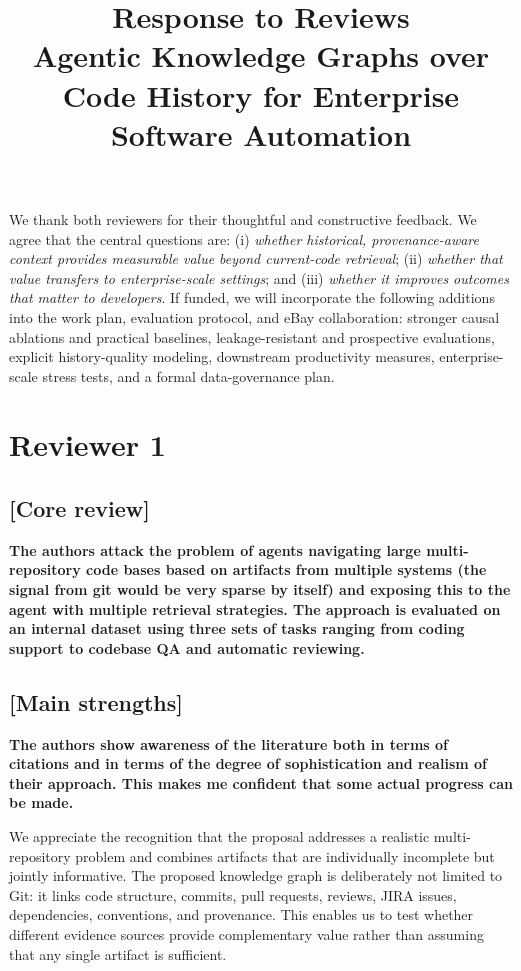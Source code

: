 \documentclass[11pt]{article}
\title{Response to Reviews\\[0.3em]
\large Agentic Knowledge Graphs over Code History for Enterprise Software Automation}
\author{}
\date{}
\begin{document}
\maketitle

We thank both reviewers for their thoughtful and constructive feedback. We agree that the central questions are: (i) \textit{whether historical, provenance-aware context provides measurable value beyond current-code retrieval}; (ii) \textit{whether that value transfers to enterprise-scale settings}; and (iii) \textit{whether it improves outcomes that matter to developers}. If funded, we will incorporate the following additions into the work plan, evaluation protocol, and eBay collaboration: stronger causal ablations and practical baselines, leakage-resistant and prospective evaluations, explicit history-quality modeling, downstream productivity measures, enterprise-scale stress tests, and a formal data-governance plan.

\section*{Reviewer 1}

\subsection*{[Core review]}

\textbf{The authors attack the problem of agents navigating large multi-repository code bases based on artifacts from multiple systems (the signal from git would be very sparse by itself) and exposing this to the agent with multiple retrieval strategies. The approach is evaluated on an internal dataset using three sets of tasks ranging from coding support to codebase QA and automatic reviewing.}


\subsection*{[Main strengths]}
\textbf{The authors show awareness of the literature both in terms of citations and in terms of the degree of sophistication and realism of their approach. This makes me confident that some actual progress can be made.} 

We appreciate the recognition that the proposal addresses a realistic multi-repository problem and combines artifacts that are individually incomplete but jointly informative. The proposed knowledge graph is deliberately not limited to Git: it links code structure, commits, pull requests, reviews, JIRA issues, dependencies, conventions, and provenance. This enables us to test whether different evidence sources provide complementary value rather than assuming that any single artifact is sufficient.
\end{document}
